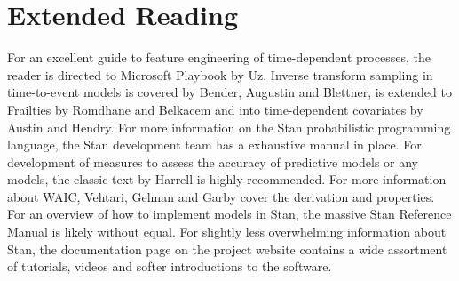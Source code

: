 










\section*{Extended Reading}

For an excellent guide to feature engineering of time-dependent processes, the reader is directed to Microsoft Playbook by Uz\cite{Uz2016}. Inverse transform sampling in time-to-event models is covered by Bender, Augustin and Blettner\cite{Bender2005}, is extended to Frailties by Romdhane and Belkacem\cite{Romdhane2015} and into time-dependent covariates by Austin\cite{Austin2012} and Hendry\cite{Hendry2014}. For more information on the Stan probabilistic programming language, the Stan development team has a exhaustive manual in place\cite{StanDevelopmentTeam2016}. For development of measures to assess the accuracy of predictive models or any models, the classic text by Harrell is highly recommended\cite{Harrell2001}. For more information about WAIC, Vehtari, Gelman and Garby cover the derivation and properties\cite{Vehtari2015}. For an overview of how to implement models in Stan, the massive Stan Reference Manual is likely without equal\cite{StanDevelopmentTeam2016}. For slightly less overwhelming information about Stan, the documentation page on the project website contains a wide assortment of tutorials, videos and softer introductions to the software\cite{StanDevelopmentTeam2016a}.



